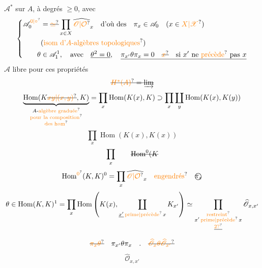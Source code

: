$\mathscr A^*$     sur $A$, à degrés $\geq0$, avec
\[
\left\{\begin{aligned}
\mathscr A_0^{\unsure{0|\circ}}&=\deleted{\unsure{\simeq}}\prod_{x\in X}\widehat{\unsure{\mathscr O|\mathcal O}}_x
\quad\text{d'où des}\quad\pi_x\in\mathscr A_0\quad(x\in\unsure{X|\mathscr X})\\
&\text{(\unsure{isom d'$A$-algèbres topologiques})}\\
\theta&\in\mathscr A_1^1,\quad\text{avec}\quad\underline{\theta^2=0},\quad
\underline{\pi_{x'}\theta\pi_x=0\quad\deleted{\unsure{x}}\quad\text{si $x'$ ne \unsure{précède} pas $x$}}
\end{aligned}\right.
\]
$\mathscr A$ libre pour ces propriétés \text{------}
\[
\deleted{\unsure{H^*(A)}=\varinjlim}
\]
\[
\underbrace{\operatorname{Hom}(K\deleted{\unsure{xy|(x,y)}},K)}_{\substack{A\text{-\unsure{algèbre graduée}}\\\text{\unsure{pour la composition}}\\\text{\unsure{des hom}}}}
=\prod_x\operatorname{Hom}(K(x),K)\supset\prod_x\coprod_y\operatorname{Hom}(K(x),K(y))
\]
\[
\prod_x\operatorname{Hom}(K(x),K(x))
\]
\[
\prod_x\qquad\deleted{\operatorname{Hom}^{0}(K}
\]
\[
\operatorname{Hom}^{\unsure{0}}(K,K)^0=\prod_x\widehat{\unsure{\mathscr O|\mathcal O}}_x
\quad\text{\unsure{engendrés}}\quad\text{\textcircled{$\pi_x$}}
\]
\[
\theta\in\operatorname{Hom}(K,K)^1=\prod_x\operatorname{Hom}\left(K(x),\coprod_{\substack{\underline{x'}\,\text{\unsure{prime|précède}}\,x}}K_{x'}\right)
\simeq\prod_{\substack{\text{\unsure{restreint}}\\x'\,\text{\unsure{prime|précède}}\,x\\\deleted{\unsure{2?}}}}\widehat{\mathscr O}_{x,x'}
\]
\[
\deleted{\unsure{\pi_x\theta}}\quad\pi_{x'}\theta\pi_x\quad.\quad
\deleted{\unsure{\widehat{\mathscr O}_x\theta\widehat{\mathscr O}_{x'}}}
\]
\[
\widehat{\mathscr O}_{x,x'}
\]
